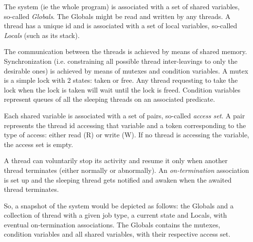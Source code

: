 \smallskip%
The system (ie the whole program) is associated with a set of shared
variables, so-called \emph{Globals}. The Globals might be read and
written by any threads.
%
A thread has a unique id and is associated with a set of local
variables, so-called \emph{Locals} (such as its stack).

\bigskip%
The communication between the threads is achieved by means of shared
memory. Synchronization (i.e. constraining all possible thread
inter-leavings to only the desirable ones) is achieved by means of
mutexes and condition variables. A mutex is a simple lock with 2
states: taken or free. Any thread requesting to take the lock when the
lock is taken will wait until the lock is freed. Condition variables
represent queues of all the sleeping threads on an associated
predicate.

\smallskip\noindent%
\begin{minipage}{0.7\textwidth}
  \setlength{\parindent}{1em}%
  Each shared variable is associated with a set of pairs, so-called
  \emph{access set}. A pair represents the thread id accessing that
  variable and a token corresponding to the type of access: either
  read (R) or write (W). If no thread is accessing the variable, the
  access set is empty.
\end{minipage}
%
%
\hfill%
\begin{minipage}{0.29\textwidth}
\begin{center}
\end{center}
\end{minipage}

\smallskip%
A thread can voluntarily stop its activity and resume it only when
another thread terminates (either normally or abnormally).  An
\emph{on-termination} association is set up and the sleeping thread
gets notified and awaken when the awaited thread terminates.


\bigskip%
So, a snapshot of the system would be depicted as follows: the Globals
and a collection of thread with a given job type, a current state and
Locals, with eventual on-termination associations. The Globals
contains %
the mutexes, condition variables and all shared variables, with their
respective access set.


